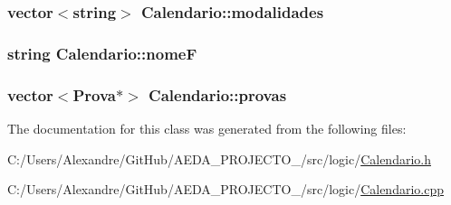 \subsubsection[{modalidades}]{\setlength{\rightskip}{0pt plus 5cm}vector$<$string$>$ Calendario\+::modalidades\hspace{0.3cm}{\ttfamily [private]}}\label{class_calendario_a6a492724444ed6b468fe230d09fd800b}
\hypertarget{class_calendario_ad14a413cc8b38380f6ea80f921cd16b4}{}
\subsubsection[{nome\+F}]{\setlength{\rightskip}{0pt plus 5cm}string Calendario\+::nome\+F\hspace{0.3cm}{\ttfamily [private]}}\label{class_calendario_ad14a413cc8b38380f6ea80f921cd16b4}
\hypertarget{class_calendario_a1c917a3325a0ebd6cbe186e976326d06}{}
\subsubsection[{provas}]{\setlength{\rightskip}{0pt plus 5cm}vector$<${\bf Prova}$\ast$$>$ Calendario\+::provas\hspace{0.3cm}{\ttfamily [private]}}\label{class_calendario_a1c917a3325a0ebd6cbe186e976326d06}


The documentation for this class was generated from the following files\+:\begin{DoxyCompactItemize}
\item 
C\+:/\+Users/\+Alexandre/\+Git\+Hub/\+A\+E\+D\+A\+\_\+\+P\+R\+O\+J\+E\+C\+T\+O\+\_/src/logic/\hyperlink{_calendario_8h}{Calendario.\+h}\item 
C\+:/\+Users/\+Alexandre/\+Git\+Hub/\+A\+E\+D\+A\+\_\+\+P\+R\+O\+J\+E\+C\+T\+O\+\_/src/logic/\hyperlink{_calendario_8cpp}{Calendario.\+cpp}\end{DoxyCompactItemize}
